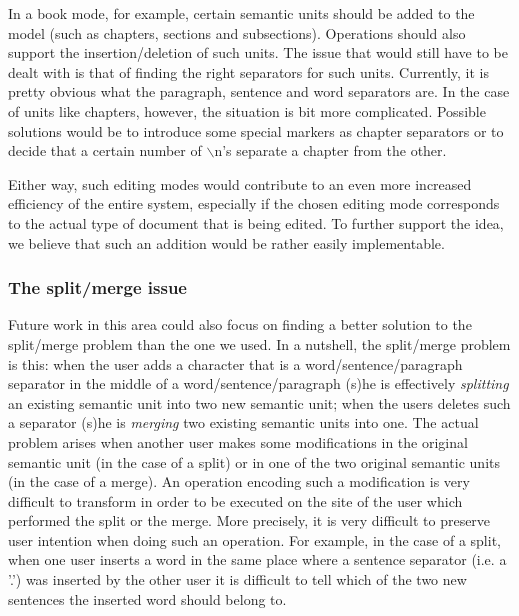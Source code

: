 In a book mode, for example, certain semantic units should be added to the model (such as
chapters, sections and subsections). Operations should also support
the insertion/deletion of such units. The issue that would still have to be dealt with is
that of finding the right separators for such units. Currently, it is pretty obvious what
the paragraph, sentence and word separators are. In the case of units like chapters, however,
the situation is bit more complicated. Possible solutions would be to introduce some special
markers as chapter separators or to decide that a certain number of $\backslash$n's separate
a chapter from the other.

Either way, such editing modes would contribute to an even more increased efficiency of the
entire system, especially if the chosen editing mode corresponds to the actual type of document
that is being edited. To further support the idea, we believe that such an addition would be
rather easily implementable.

\subsubsection{The split/merge issue}

Future work in this area could also focus on finding a better solution to the split/merge
problem than the one we used. In a nutshell, the split/merge problem is this: when the user
adds a character that is a word/sentence/paragraph separator in the middle of a
word/sentence/paragraph (s)he is effectively \emph{splitting} an existing semantic
unit into two new semantic unit; when the users deletes such a separator (s)he is
\emph{merging} two existing semantic units into one. The actual problem arises when
another user makes some modifications in the original semantic unit (in the case of
a split) or in one of the two original semantic units (in the case of a merge). An
operation encoding such a modification is very difficult to transform in order to be
executed on the site of the user which performed the split or the merge. More precisely,
it is very difficult to preserve user intention when doing such an operation. For example,
in the case of a split, when one user inserts a word in the same place where a sentence
separator (i.e. a '.') was inserted by the other user it is difficult to tell which of
the two new sentences the inserted word should belong to.

